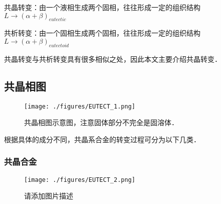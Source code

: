 共晶转变：由一个液相生成两个固相，往往形成一定的组织结构 $L \rightarrow (\alpha+\beta)_{eutectic}$

共析转变：由一个固相生成两个固相，往往形成一定的组织结构 $L \rightarrow (\alpha+\beta)_{eutectoid}$

共晶转变与共析转变具有很多相似之处，因此本文主要介绍共晶转变．

\subsection{共晶相图}
\begin{figure}[ht]
\centering
\texttt{[image: ./figures/EUTECT\_1.png]}
\caption{共晶相图示意图，注意固体部分不完全是固溶体．} \label{EUTECT_fig1}
\end{figure}
根据具体的成分不同，共晶系合金的转变过程可分为以下几类．

\subsubsection{共晶合金}
\begin{figure}[ht]
\centering
\texttt{[image: ./figures/EUTECT\_2.png]}
\caption{请添加图片描述} \label{EUTECT_fig2}
\end{figure}